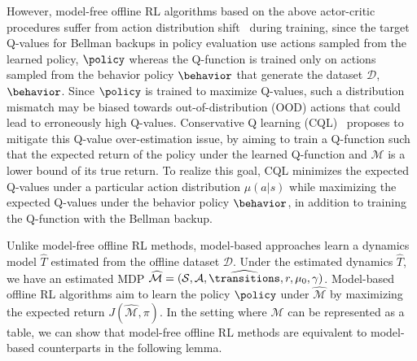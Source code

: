 However, model-free offline RL algorithms based on the above actor-critic procedures suffer from action distribution shift~\citep{kumar2019stabilizing,wu2019behavior,jaques2019way,levine2020offline} during training, since the target Q-values for Bellman backups in policy evaluation use actions sampled from the learned policy, $\policy$ whereas the Q-function is trained only on actions sampled from the behavior policy $\behavior$ that generate the dataset $\mathcal{D}$, $\behavior$. Since $\policy$ is trained to maximize Q-values, such a distribution mismatch may be biased towards out-of-distribution (OOD) actions that could lead to erroneously high Q-values. Conservative Q learning (CQL)~\citep{kumar2020conservative}  proposes to mitigate this Q-value over-estimation issue, by aiming to train a Q-function such that the expected return of the policy under the learned Q-function and $\mathcal{M}$ is a lower bound of its true return. To realize this goal, CQL minimizes the expected Q-values under a particular action distribution $\mu(a|s)$ while maximizing the expected Q-values under the behavior policy $\behavior$, in addition to training the Q-function with the Bellman backup.

Unlike model-free offline RL methods, model-based approaches learn a dynamics model $\widehat{T}$ estimated from the offline dataset $\mathcal{D}$. Under the estimated dynamics $\widehat{T}$, we have an estimated MDP $\widehat{\mathcal{M}} = (\mathcal{S}, \mathcal{A}, \widehat{\transitions}, r, \mu_0, \gamma)$. Model-based offline RL algorithms aim to learn the policy $\policy$ under $\widehat{\mathcal{M}}$ by maximizing the expected return $J(\widehat{\mathcal{M}}, \pi)$. In the setting where $\mathcal{M}$ can be represented as a table, we can show that model-free offline RL methods are equivalent to model-based counterparts in the following lemma.


